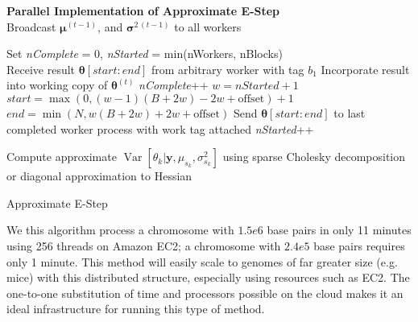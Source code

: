 \documentclass[12pt]{article}
\DeclareMathOperator{\Var}{Var}
\begin{document}
\begin{algorithm}%
 \hspace{-8pt} \textbf{Parallel Implementation of Approximate E-Step}\\
 Broadcast $\bm \mu^{(t-1)}$, and $\bm \sigma^{2\,(t-1)}$ to all workers \;

  {

 Set \textit{nComplete} = 0, \textit{nStarted} = min(nWorkers, nBlocks) \\
  {
   Receive result $\bm \theta[start:end]$ from arbitrary worker with tag $b_1$ \;
   Incorporate result into working copy of $\bm \theta^{(t)}$ \;
   \textit{nComplete}++ \;
    {
     $w = nStarted + 1$\;
     $start = \max(0, (w - 1)(B + 2w) - 2w + \mbox{offset}) + 1$\;
     $end = \min(N, w(B + 2w) + 2w + \mbox{offset})$\;
     Send $\bm \theta[start:end] $ to last completed worker process with work tag attached\;
     \textit{nStarted}++\;
   }
 }
 }

 Compute approximate $\Var \left[ \theta_k | \bm y, \mu_{s_k}, \sigma^2_{s_k}  \right]$ using sparse Cholesky decomposition or diagonal approximation to Hessian\;

 \caption{Approximate E-Step \label{alg:parallel}}
\end{algorithm}

We this algorithm process a chromosome with $1.5e6$ base pairs in only 11 minutes using 256 threads on Amazon EC2; a chromosome with $2.4e5$ base pairs requires only 1 minute.
This method will easily scale to genomes of far greater size (e.g. mice) with this distributed structure, especially using resources such as EC2.
The one-to-one substitution of time and processors possible on the cloud makes it an ideal infrastructure for running this type of method.


\clearpage
\end{document}
